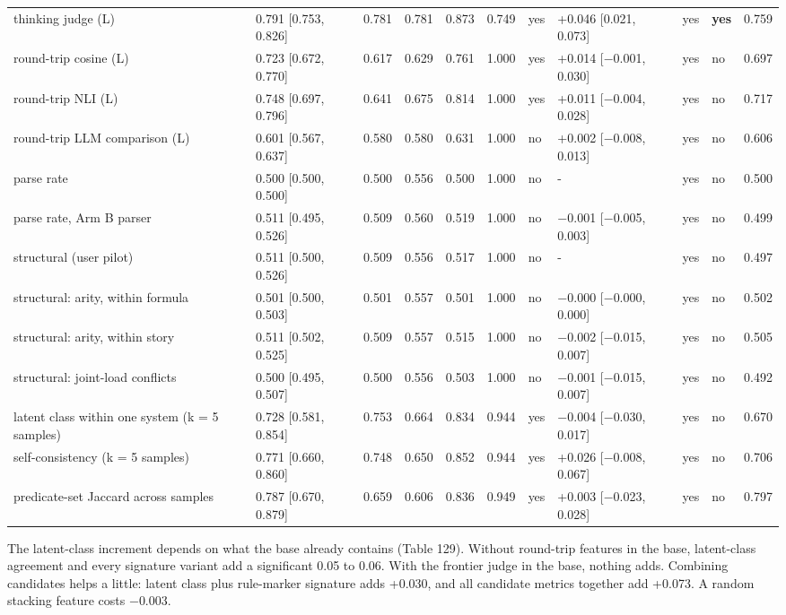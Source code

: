 \documentclass[11pt,letterpaper]{article}
\begin{document}
\begin{landscape}
{\begin{longtable}
{}thinking judge (L) & 0.791 [0.753, 0.826] & 0.781 & 0.781 & 0.873 & 0.749 & yes & +0.046 [0.021, 0.073] & yes & \textbf{yes} & 0.759 \\
{}round-trip cosine (L) & 0.723 [0.672, 0.770] & 0.617 & 0.629 & 0.761 & 1.000 & yes & +0.014 [$-$0.001, 0.030] & yes & no & 0.697 \\
{}round-trip NLI (L) & 0.748 [0.697, 0.796] & 0.641 & 0.675 & 0.814 & 1.000 & yes & +0.011 [$-$0.004, 0.028] & yes & no & 0.717 \\
{}round-trip LLM comparison (L) & 0.601 [0.567, 0.637] & 0.580 & 0.580 & 0.631 & 1.000 & no & +0.002 [$-$0.008, 0.013] & yes & no & 0.606 \\
{}parse rate & 0.500 [0.500, 0.500] & 0.500 & 0.556 & 0.500 & 1.000 & no & - & yes & no & 0.500 \\
{}parse rate, Arm B parser & 0.511 [0.495, 0.526] & 0.509 & 0.560 & 0.519 & 1.000 & no & $-$0.001 [$-$0.005, 0.003] & yes & no & 0.499 \\
{}structural (user pilot) & 0.511 [0.500, 0.526] & 0.509 & 0.556 & 0.517 & 1.000 & no & - & yes & no & 0.497 \\
{}structural: arity, within formula & 0.501 [0.500, 0.503] & 0.501 & 0.557 & 0.501 & 1.000 & no & $-$0.000 [$-$0.000, 0.000] & yes & no & 0.502 \\
{}structural: arity, within story & 0.511 [0.502, 0.525] & 0.509 & 0.557 & 0.515 & 1.000 & no & $-$0.002 [$-$0.015, 0.007] & yes & no & 0.505 \\
{}structural: joint-load conflicts & 0.500 [0.495, 0.507] & 0.500 & 0.556 & 0.503 & 1.000 & no & $-$0.001 [$-$0.015, 0.007] & yes & no & 0.492 \\
{}latent class within one system (k = 5 samples) & 0.728 [0.581, 0.854] & 0.753 & 0.664 & 0.834 & 0.944 & yes & $-$0.004 [$-$0.030, 0.017] & yes & no & 0.670 \\
{}self-consistency (k = 5 samples) & 0.771 [0.660, 0.860] & 0.748 & 0.650 & 0.852 & 0.944 & yes & +0.026 [$-$0.008, 0.067] & yes & no & 0.706 \\
{}predicate-set Jaccard across samples & 0.787 [0.670, 0.879] & 0.659 & 0.606 & 0.836 & 0.949 & yes & +0.003 [$-$0.023, 0.028] & yes & no & 0.797 \\
\end{longtable}
}
\end{landscape}

The latent-class increment depends on what the base already contains (Table 129). Without round-trip features in the base, latent-class agreement and every signature variant add a significant 0.05 to 0.06. With the frontier judge in the base, nothing adds. Combining candidates helps a little: latent class plus rule-marker signature adds +0.030, and all candidate metrics together add +0.073. A random stacking feature costs $-$0.003.
\end{document}
